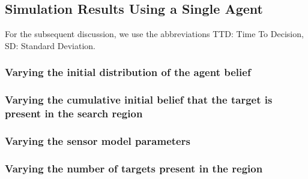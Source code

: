 \subsection{Simulation Results Using a Single Agent}\label{subsec:SingleAgentSingleSourceResults}
For the subsequent discussion, we use the abbreviations TTD: Time To Decision, SD: Standard Deviation.
    
\subsubsection{Varying the initial distribution of the agent belief}\label{subsubsec:VaryingPrior}

\break

\subsubsection{Varying the cumulative initial belief that the target is present in the search region}\label{subsubsec:VaryingPrior}

\break


\subsubsection{Varying the sensor model parameters}\label{subsubsec:MicalibratedSensor}

\break

\subsubsection{Varying the number of targets present in the region}\label{subsubsec:VaryingNoTargets}

%


\break